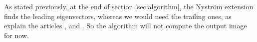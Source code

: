 As stated previously, at the end of section \ref{sec:algorithm}, the Nystr\"om extension finds the leading eigenvectors, whereas we would need the trailing ones, as explain the articles \cite{belongie_spectral_2002}, \cite{fowlkes_spectral_2004} and \cite{glide_2014}.
So the algorithm will not compute the output image for now.
